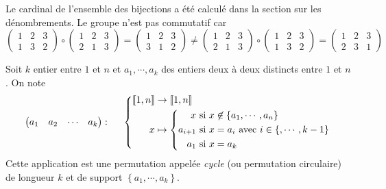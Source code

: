 \begin{demo}
 Le cardinal de l'ensemble des bijections a été calculé dans la section sur les dénombrements. Le groupe n'est pas commutatif car 
\begin{displaymath}
 \begin{pmatrix}
  1 & 2 & 3 \\
  1 & 3 & 2
 \end{pmatrix}
\circ
 \begin{pmatrix}
  1 & 2 & 3 \\
  2 & 1 & 3
 \end{pmatrix}
 =
 \begin{pmatrix}
  1 & 2 & 3 \\
  3 & 1 & 2
 \end{pmatrix}
\neq
 \begin{pmatrix}
  1 & 2 & 3 \\
  2 & 1 & 3
 \end{pmatrix}
\circ
 \begin{pmatrix}
  1 & 2 & 3 \\
  1 & 3 & 2
 \end{pmatrix}
=
 \begin{pmatrix}
  1 & 2 & 3 \\
  2 & 3 & 1
 \end{pmatrix}
\end{displaymath}
\end{demo}
   
\begin{defi}
 Soit $k$ entier entre $1$ et $n$ et $a_1,\cdots,a_k$ des entiers deux à deux distincts entre $1$ et $n$. On note
\[
 \begin{pmatrix}
  a_1 & a_2 & \cdots & a_k
 \end{pmatrix}: \hspace{0.5cm}
 \left\lbrace
 \begin{aligned}
   \llbracket 1,n \rrbracket &\rightarrow \llbracket 1,n \rrbracket \\
   x &\mapsto 
    \left\lbrace 
       \begin{aligned}
           x&\text{ si }x\not\in\left\lbrace a_1,\cdots,a_n\right\rbrace\\
           a_{i+1} &\text{ si }x=a_i \text{ avec } i\in\left\lbrace,\cdots,k-1\right\rbrace \\
           a_1 &\text{ si }x=a_k
       \end{aligned}
    \right. 
 \end{aligned}
\right.
\]
Cette application est une permutation appelée \emph{cycle} (ou permutation circulaire) de longueur $k$ et de support $\left\lbrace a_1,\cdots,a_k \right\rbrace$.
\end{defi}
